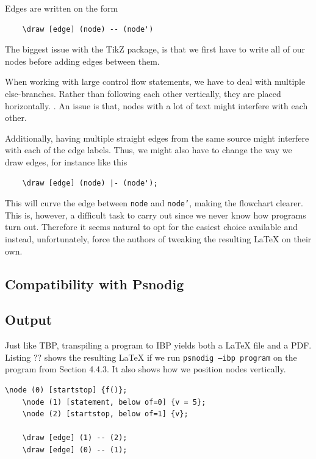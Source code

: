 Edges are written on the form

\begin{verbatim}
    \draw [edge] (node) -- (node')
\end{verbatim}

The biggest issue with the TikZ package, is that we first have to write all of our nodes before adding edges between them. 

When working with large control flow statements, we have to deal with multiple else-branches. Rather than following each other vertically, they are placed horizontally. . An issue is that, nodes with a lot of text might interfere with each other. \\


Additionally, having multiple straight edges from the same source might interfere with each of the edge labels. Thus, we might also have to change the way we draw edges, for instance like this

\begin{lstlisting}
    \draw [edge] (node) |- (node');
\end{lstlisting}

This will curve the edge between \texttt{node} and \texttt{node'}, making the flowchart clearer. This is, however, a difficult task to carry out since we never know how programs turn out. Therefore it seems natural to opt for the easiest choice available and instead, unfortunately, force the authors of tweaking the resulting LaTeX on their own. \\

\subsection{Compatibility with Psnodig}


\subsection{Output}

Just like TBP, transpiling a program to IBP yields both a LaTeX file and a PDF. Listing ?? shows the resulting LaTeX if we run \texttt{psnodig --ibp program} on the program from Section 4.4.3. It also shows how we position nodes vertically. \hfill \\

\begin{lstlisting}[caption={The LaTeX from transpiling a program to IBP}, captionpos=b, frame=trbl]
    \node (0) [startstop] {f()};
    \node (1) [statement, below of=0] {v = 5};
    \node (2) [startstop, below of=1] {v};

    \draw [edge] (1) -- (2);
    \draw [edge] (0) -- (1);
\end{lstlisting}